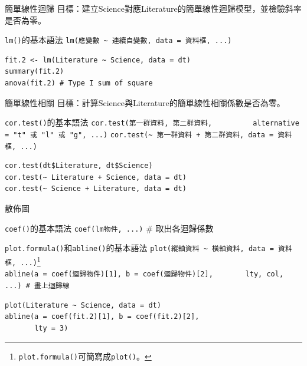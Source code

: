 \documentclass[12pt, aspectratio=43]{beamer}
\let\oldfootnote\footnote
\renewcommand\footnote[1]{\hspace{-0.3em}\oldfootnote{\ignorespaces#1}\hspace{0.3em}}
\begin{document}
\begin{frame}[fragile]{簡單線性迴歸}
目標：建立Science對應Literature的簡單線性迴歸模型，並檢驗斜率是否為零。
\begin{block}{\texttt{lm()}的基本語法}
\verb+lm(應變數 ~ 連續自變數, data = 資料框, ...)+
\end{block}
\begin{verbatim}
fit.2 <- lm(Literature ~ Science, data = dt)
summary(fit.2)
anova(fit.2) # Type I sum of square
\end{verbatim}
\end{frame}


\begin{frame}[fragile]{簡單線性相關}
目標：計算Science與Literature的簡單線性相關係數是否為零。
\begin{block}{\texttt{cor.test()}的基本語法}
\verb+cor.test(第一群資料, 第二群資料,+
\verb+         alternative = "t" 或 "l" 或 "g", ...)+
\verb#cor.test(~ 第一群資料 + 第二群資料, data = 資料框, ...)#
\end{block}
\begin{verbatim}
cor.test(dt$Literature, dt$Science)
cor.test(~ Literature + Science, data = dt)
cor.test(~ Science + Literature, data = dt)
\end{verbatim}
\end{frame}


\begin{frame}[fragile]{散佈圖}

\begin{block}{\texttt{coef()}的基本語法}
\verb+coef(lm物件, ...)+  \# 取出各迴歸係數
\end{block}

\begin{block}{\texttt{plot.formula()}和\texttt{abline()}的基本語法}
\verb+plot(縱軸資料 ~ 橫軸資料, data = 資料框, ...)+\oldfootnote{\texttt{plot.formula()}可簡寫成\texttt{plot()}。}\\
\verb+abline(a = coef(迴歸物件)[1], b = coef(迴歸物件)[2],+
\verb+       lty, col, ...) # 畫上迴歸線 +
\end{block}

\begin{verbatim}
plot(Literature ~ Science, data = dt)
abline(a = coef(fit.2)[1], b = coef(fit.2)[2],
       lty = 3)
\end{verbatim}
\end{frame}
\end{document}
